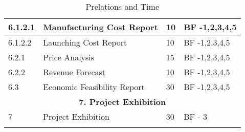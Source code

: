 \begin{longtable}{ | p{1.3cm} | p{7cm} | p{3cm} | p{3.5cm} |}
6.1.2.1 & Manufacturing Cost Report & 10 & BF -1,2,3,4,5  \\ \hline
6.1.2.2 & Launching Cost Report  & 10 & BF -1,2,3,4,5 \\ \hline
6.2.1 & Price Analysis & 15 & BF -1,2,3,4,5  \\ \hline
6.2.2 & Revenue Forecast & 10 & BF -1,2,3,4,5  \\ \hline
6.3 & Economic Feasibility Report & 30 & BF -1,2,3,4,5 \\ \hline
\multicolumn{4}{|c|}{\textbf{7. Project Exhibition}} \\ \hline
7 & Project Exhibition &30 & BF - 3 \\ \hline
\caption{Prelations and Time} \\
\end{longtable}